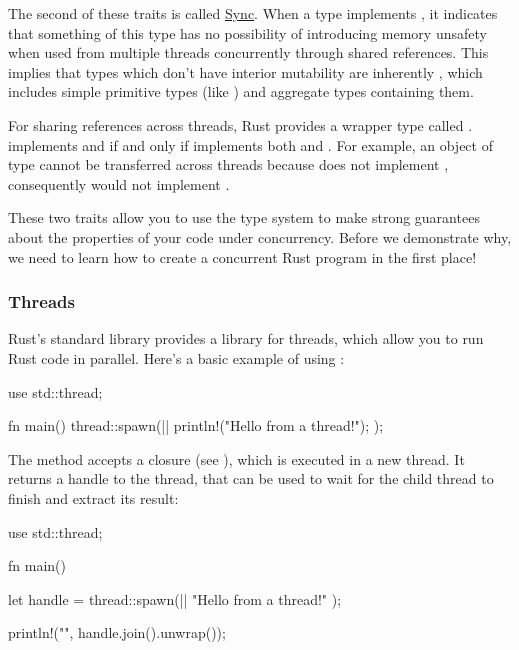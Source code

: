 
The second of these traits is called \href{https://doc.rust-lang.org/std/marker/trait.Sync.html}{Sync}. When a type  
implements , it indicates that something of this type has no possibility of introducing memory unsafety when used from 
multiple threads concurrently through shared references. This implies that types which don't have interior mutability are inherently 
, which includes simple primitive types (like ) and aggregate types containing them.

\blank

For sharing references across threads, Rust provides a wrapper type called .  implements  and 
 if and only if  implements both  and . For example, an object of type  
cannot be transferred across threads because  does not implement , consequently  would 
not implement .

\blank

These two traits allow you to use the type system to make strong guarantees about the properties of your code under concurrency. 
Before we demonstrate why, we need to learn how to create a concurrent Rust program in the first place!

\subsubsection*{Threads}

Rust's standard library provides a library for threads, which allow you to run Rust code in parallel. Here's a basic example of using 
:

\begin{rustc}
use std::thread;

fn main() {
    thread::spawn(|| {
        println!("Hello from a thread!");
    });
}
\end{rustc}

The  method accepts a closure (see ), which is executed in a new thread. It returns 
a handle to the thread, that can be used to wait for the child thread to finish and extract its result:

\begin{rustc}
use std::thread;

fn main() {
    let handle = thread::spawn(|| {
        "Hello from a thread!"
    });

    println!("{}", handle.join().unwrap());
}
\end{rustc}

